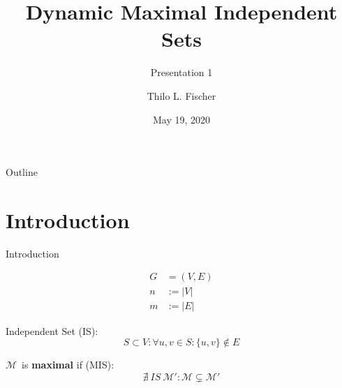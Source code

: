 \documentclass{beamer}
\title[ShortTitle]{Dynamic Maximal Independent Sets}
\subtitle{Presentation 1}
\author{Thilo L. Fischer}
\date{May 19, 2020}
\newcommand{\M}{$\mathcal{M}$}
\begin{document}
\begin{frame}
  \titlepage
\end{frame}

\begin{frame}{Outline}
  \tableofcontents
\end{frame}

\section{Introduction}
\begin{frame}{Introduction}

  \begin{equation*} 
    \begin{split} 
      G &= (V, E) \\
      n &:= \vert V \vert \\
      m &:= \vert E \vert 
    \end{split}
  \end{equation*}

  Independent Set (IS):
  \begin{equation*}
    S \subset V: \forall u, v \in S: \{u, v\} \notin E
  \end{equation*}

  \M\ is \textbf{maximal} if (MIS):
  \begin{equation*}
     \nexists \  IS \ \mathcal{M'}: \mathcal{M} \subsetneq \mathcal{M'}
  \end{equation*}

\end{frame}
\end{document}
